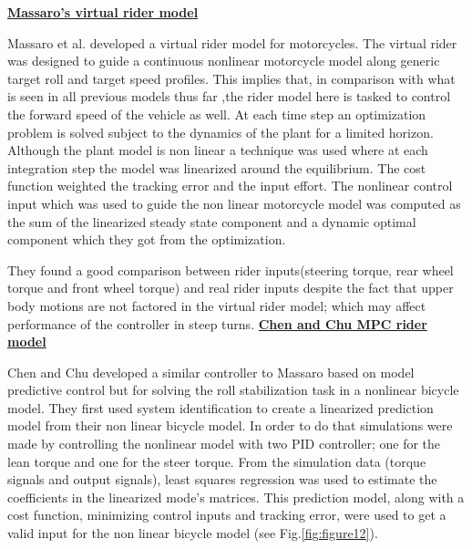 \bigbreak
\underline{\textbf{Massaro's virtual rider model \cite{massaro2012virtual}}}
\newline
\par
Massaro et al. developed a virtual rider model for motorcycles. The virtual rider was designed to guide a continuous nonlinear  motorcycle model along generic target roll and target speed profiles. This implies that, in comparison with what is seen in all previous models thus far ,the rider model here is tasked to control the forward speed of the vehicle as well. At each time step an optimization problem is solved subject to the dynamics of  the plant for a limited horizon. Although  the plant model is non linear a technique was used where at each integration step the model was linearized around the equilibrium. The cost function weighted the tracking error and the input effort. The nonlinear control input which was used to guide the non linear motorcycle model was computed as  the sum of the linearized steady state component and a dynamic optimal component which they got from the optimization.
\par
They found a good comparison between  rider inputs(steering torque, rear wheel torque and front wheel torque) and real rider inputs despite the fact that upper body motions are not factored in the virtual rider model; which may affect performance of the controller in steep turns.
\bigbreak
\underline{\textbf{Chen and Chu MPC rider model \cite{chu2018modelling}}}
\newline
\par
Chen and Chu  developed a similar controller to Massaro based on model predictive control but for solving the roll stabilization task in a nonlinear bicycle model. They first used system identification to create a linearized prediction model from their non linear bicycle model. In order to do that simulations were made by controlling the nonlinear model with two PID controller; one for the lean torque and one for the steer torque. From the simulation data (torque signals and output signals), least squares regression was used to estimate the coefficients in the linearized mode’s matrices. This prediction model, along with a cost function, minimizing control inputs and tracking error, were used to get a valid input for the non linear bicycle model (see Fig.\ref{fig:figure12}).
